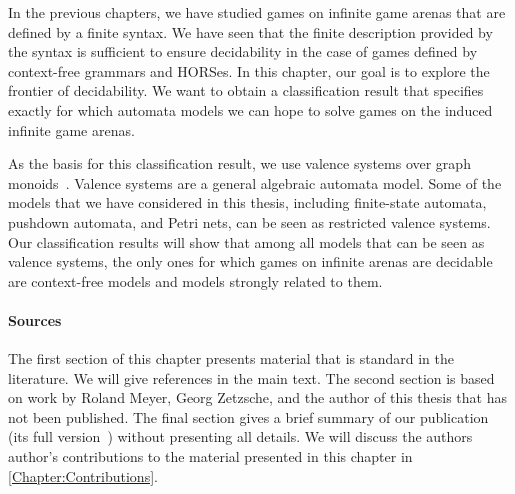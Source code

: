 \documentclass[../../diss.tex]{subfiles}
\begin{document}
In the previous chapters, we have studied games on infinite game arenas that are defined by a finite syntax.
We have seen that the finite description provided by the syntax is sufficient to ensure decidability in the case of games defined by context-free grammars and HORSes.
In this chapter, our goal is to explore the frontier of decidability.
We want to obtain a classification result that specifies exactly for which automata models we can hope to solve games on the induced infinite game arenas.

As the basis for this classification result, we use valence systems over graph monoids~\cite{Zetzsche15d}.
Valence systems are a general algebraic automata model.
Some of the models that we have considered in this thesis, including finite-state automata, pushdown automata, and Petri nets, can be seen as restricted valence systems.
Our classification results will show that among all models that can be seen as valence systems, the only ones for which games on infinite arenas are decidable are context-free models and models strongly related to them.

\paragraph{Sources}

The first section of this chapter presents material that is standard in the literature.
We will give references in the main text.
The second section is based on work by Roland Meyer, Georg Zetzsche, and the author of this thesis that has not been published.
The final section gives a brief summary of our publication~\cite{MeyerMZ18} (\resp its full version~\cite{MeyerMZ18a}) without presenting all details.
We will discuss the authors author's contributions to the material presented in this chapter in \cref{Chapter:Contributions}.
\end{document}
